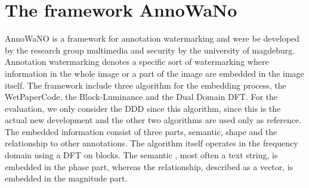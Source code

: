 \section{The framework AnnoWaNo}

AnnoWaNO is a framework for annotation watermarking and were be developed by the research group multimedia and security by the university of magdeburg. Annotation watermarking denotes a specific sort of watermarking where information in the whole image or a part of the image are embedded in the image itself. The framework include three algorithm for the embedding process, the WetPaperCode, the Block-Luminance and the Dual Domain DFT. For the evaluation, we only consider the DDD since this algorithm, since this is the actual new development and the other two algorithms are used only as reference. The embedded information consist of three parts, semantic, shape and the relationship to other annotations. The algorithm itself operates in the frequency domain using a DFT on blocks. \cite{Schott2009} The semantic , most often a text string, is embedded in the phase part, whereas the relationship, described as a vector, is embedded in the magnitude part.


